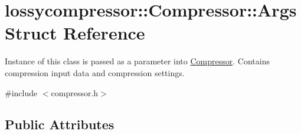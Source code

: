 \hypertarget{structlossycompressor_1_1_compressor_1_1_args}{}\section{lossycompressor\+:\+:Compressor\+:\+:Args Struct Reference}
\label{structlossycompressor_1_1_compressor_1_1_args}


Instance of this class is passed as a parameter into \hyperlink{classlossycompressor_1_1_compressor}{Compressor}. Contains compression input data and compression settings.  




{\ttfamily \#include $<$compressor.\+h$>$}

\subsection*{Public Attributes}

